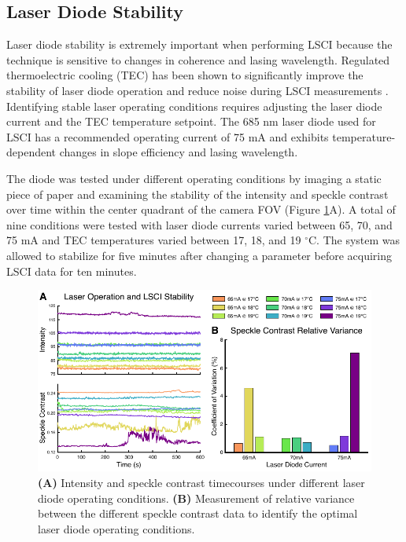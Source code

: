 \subsection{Laser Diode Stability} \label{ssec:laser_stability}

Laser diode stability is extremely important when performing LSCI because the technique is sensitive to changes in coherence and lasing wavelength. Regulated thermoelectric cooling (TEC) has been shown to significantly improve the stability of laser diode operation and reduce noise during LSCI measurements \cite{Richards:2016hy}. Identifying stable laser operating conditions requires adjusting the laser diode current and the TEC temperature setpoint. The 685 nm laser diode used for LSCI has a recommended operating current of 75 mA and exhibits temperature-dependent changes in slope efficiency and lasing wavelength.

The diode was tested under different operating conditions by imaging a static piece of paper and examining the stability of the intensity and speckle contrast over time within the center quadrant of the camera FOV (Figure \ref{fig:laserstability}A). A total of nine conditions were tested with laser diode currents varied between 65, 70, and 75 mA and TEC temperatures varied between 17, 18, and 19 $^\circ$C. The system was allowed to stabilize for five minutes after changing a parameter before acquiring LSCI data for ten minutes.

\begin{figure}
    \includegraphics{figures/chapter_2/laserstability.pdf}
    \caption{
        \label{fig:laserstability}
        \textbf{(A)} Intensity and speckle contrast timecourses under different laser diode operating conditions. \textbf{(B)} Measurement of relative variance between the different speckle contrast data to identify the optimal laser diode operating conditions.
    }
\end{figure}


